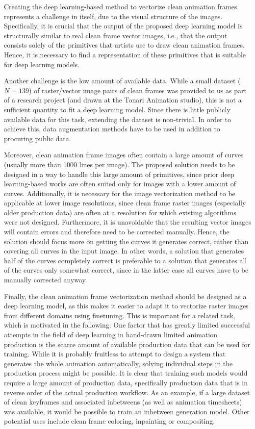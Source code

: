Creating the deep learning-based method to vectorize clean animation frames represents a challenge in itself, due to the visual structure of the images. Specifically, it is crucial that the output of the proposed deep learning model is structurally similar to real clean frame vector images, i.e., that the output consists solely of the primitives that artists use to draw clean animation frames. Hence, it is necessary to find a representation of these primitives that is suitable for deep learning models.

Another challenge is the low amount of available data. While a small dataset ($N=139$) of raster/vector image pairs of clean frames was provided to us as part of a research project (and drawn at the Tonari Animation studio), this is not a sufficient quantity to fit a deep learning model. Since there is little publicly available data for this task, extending the dataset is non-trivial. In order to achieve this, data augmentation methods have to be used in addition to procuring public data.

Moreover, clean animation frame images often contain a large amount of curves (usually more than 1000 lines per image). The proposed solution needs to be designed in a way to handle this large amount of primitives, since prior deep learning-based works are often suited only for images with a lower amount of curves. 
Additionally, it is necessary for the image vectorization method to be applicable at lower image resolutions, since clean frame raster images (especially older production data) are often at a resolution for which existing algorithms were not designed.
Furthermore, it is unavoidable that the resulting vector images will contain errors and therefore need to be corrected manually. Hence, the solution should focus more on getting the curves it generates correct, rather than covering all curves in the input image. In other words, a solution that generates half of the curves completely correct is preferable to a solution that generates all of the curves only somewhat correct, since in the latter case all curves have to be manually corrected anyway.

Finally, the clean animation frame vectorization method should be designed as a deep learning model, as this makes it easier to adapt it to vectorize raster images from different domains using finetuning. This is important for a related task, which is motivated in the following: One factor that has greatly limited successful attempts in the field of deep learning in hand-drawn limited animation production is the scarce amount of available production data that can be used for training. While it is probably fruitless to attempt to design a system that generates the whole animation automatically, solving individual steps in the production process might be possible. It is clear that training such models would require a large amount of production data, specifically production data that is in reverse order of the actual production workflow. As an example, if a large dataset of clean keyframes and associated inbetweens (as well as animation timesheets) was available, it would be possible to train an inbetween generation model. Other potential uses include clean frame coloring, inpainting or compositing.

